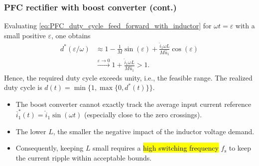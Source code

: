 \begin{frame}
	\frametitle{PFC rectifier with boost converter (cont.)}
	Evaluating \eqref{eq:PFC_duty_cycle_feed_forward_with_inductor} for $\omega t=\varepsilon$ with a small positive $\varepsilon$, one obtains
	\begin{equation*}
		\begin{aligned}
			d^*(\varepsilon/\omega) & \approx 1-\frac{1}{M}\sin(\varepsilon)+\frac{\hat{i}_1\omega L}{M\hat{u}_1}\cos(\varepsilon) \\
			                        & \xrightarrow{\varepsilon\to0}1+\frac{\hat{i}_1\omega L}{M\hat{u}_1}>1.
		\end{aligned}
	\end{equation*}\pause
	Hence, the required duty cycle exceeds unity, i.e., the feasible range. The realized duty cycle is $d(t)=\min\{1,\max\{0,d^*(t)\}\}$.
	\begin{itemize}
		\item The boost converter cannot exactly track the average input current reference $\overline{i}_1^*(t)=\hat{i}_1\sin(\omega t)$ (especially close to the zero crossings).\pause
		\item The lower $L$, the smaller the negative impact of the inductor voltage demand.\pause
		\item Consequently, keeping $L$ small requires a \hl{high switching frequency} $f_\mathrm{s}$ to keep the current ripple within acceptable bounds.
	\end{itemize}
\end{frame}

